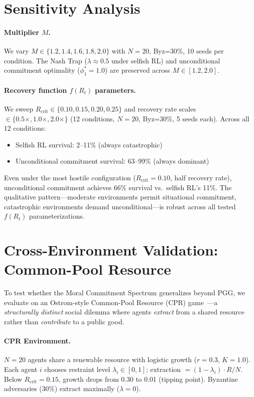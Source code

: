 \documentclass{article}
\begin{document}
\section{Sensitivity Analysis}
\label{app:sensitivity}

\paragraph{Multiplier $M$.}
We vary $M \in \{1.2, 1.4, 1.6, 1.8, 2.0\}$ with $N=20$, Byz=30\%, 10 seeds per condition.
The Nash Trap ($\lambda \approx 0.5$ under selfish RL) and unconditional commitment optimality ($\phi_1^* = 1.0$) are preserved across $M \in [1.2, 2.0]$.

\paragraph{Recovery function $f(R_t)$ parameters.}
We sweep $R_{\text{crit}} \in \{0.10, 0.15, 0.20, 0.25\}$ and recovery rate scales $\in \{0.5\times, 1.0\times, 2.0\times\}$ (12 conditions, $N=20$, Byz=30\%, 5 seeds each).
Across all 12 conditions:
\begin{itemize}
    \item Selfish RL survival: 2--11\% (always catastrophic)
    \item Unconditional commitment survival: 63--99\% (always dominant)
\end{itemize}
Even under the most hostile configuration ($R_{\text{crit}}=0.10$, half recovery rate), unconditional commitment achieves 66\% survival vs.\ selfish RL's 11\%.
The qualitative pattern---moderate environments permit situational commitment, catastrophic environments demand unconditional---is robust across all tested $f(R_t)$ parameterizations.

\section{Cross-Environment Validation: Common-Pool Resource}
\label{app:cpr}

To test whether the Moral Commitment Spectrum generalizes beyond PGG, we evaluate on an Ostrom-style Common-Pool Resource (CPR) game~\citep{ostrom1990governing}---a \emph{structurally distinct} social dilemma where agents \emph{extract} from a shared resource rather than \emph{contribute} to a public good.

\paragraph{CPR Environment.} $N{=}20$ agents share a renewable resource with logistic growth ($r{=}0.3$, $K{=}1.0$). Each agent $i$ chooses restraint level $\lambda_i \in [0,1]$; extraction $= (1-\lambda_i) \cdot R/N$. Below $R_{\text{crit}}{=}0.15$, growth drops from 0.30 to 0.01 (tipping point). Byzantine adversaries ($30\%$) extract maximally ($\lambda{=}0$).
\end{document}
